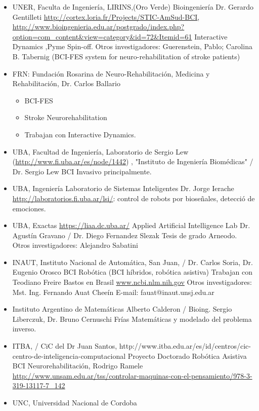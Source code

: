 \begin{itemize}
\item UNER, Faculta de Ingeniería, LIRINS,(Oro Verde) Bioingeniería  Dr. Gerardo Gentilleti
\url{http://cortex.loria.fr/Projects/STIC-AmSud-BCI},
\url{http://www.bioingenieria.edu.ar/postgrado/index.php?option=com_content&view=category&id=72&Itemid=61}
Interactive Dynamics ,Pyme Spin-off.
Otros investigadores: Guerenstein, Pablo; Carolina B. Tabernig (BCI-FES system for neuro-rehabilitation of stroke patients)
\item FRN: Fundación Rosarina de Neuro-Rehabilitación, Medicina y Rehabilitación, Dr. Carlos Ballario
\begin{itemize}
\item BCI-FES
\item Stroke Neurorehabilitation
\item Trabajan con Interactive Dynamics.
\end{itemize}
\item UBA, Facultad de Ingeniería, Laboratorio de Sergio Lew (\url{http://www.fi.uba.ar/es/node/1442}) , "Instituto de Ingeniería Biomédicas" / Dr. Sergio Lew
BCI Invasivo principalmente.
\item UBA, Ingeniería
Laboratorio de Sistemas Inteligentes Dr. Jorge Ierache \url{http://laboratorios.fi.uba.ar/lsi/}: control de robots por bioseñales, detecció de emociones.
\item UBA, Exactas
\url{https://liaa.dc.uba.ar/} Applied Artificial Intelligence Lab Dr. Agustín Gravano / Dr. Diego Fernandez Slezak
Tesis de grado Arneodo.
Otros investigadores: Alejandro Sabatini
\item INAUT, Instituto Nacional de Automática, San Juan, / Dr. Carlos Soria, Dr. Eugenio Orosco
BCI Robótica (BCI híbridos, robótica asistiva)
Trabajan con Teodiano Freire Bastos en Brasil
\url{www.ncbi.nlm.nih.gov}
Otros investigadores: Mst. Ing. Fernando Auat Cheeín
E-mail: fauat@inaut.unsj.edu.ar
\item Instituto Argentino de Matemáticas Alberto Calderon / Bioing. Sergio Liberczuk, Dr. Bruno Cernuschi Frías
Matemáticas y modelado del problema inverso.
\item ITBA, / CiC del Dr Juan Santos, http://www.itba.edu.ar/es/id/centros/cic-centro-de-inteligencia-computacional
Proyecto Doctorado Robótica Asistiva BCI Neurorehabilitación, Rodrigo Ramele
\url{http://www.unsam.edu.ar/tss/controlar-maquinas-con-el-pensamiento/978-3-319-13117-7_142}
\item UNC, Universidad Nacional de Cordoba

\end{itemize}
